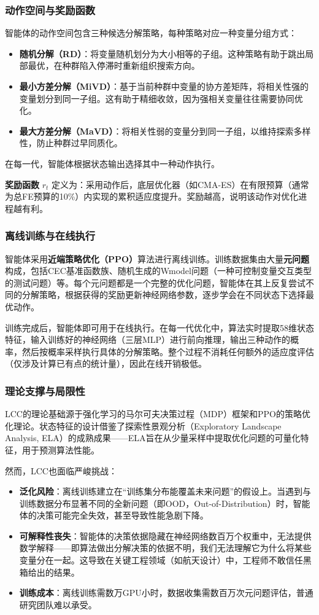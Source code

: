 \subsubsection{动作空间与奖励函数}
智能体的动作空间包含三种候选分解策略，每种策略对应一种变量分组方式：
\begin{itemize}
    \item \textbf{随机分解（RD）}：将变量随机划分为大小相等的子组。这种策略有助于跳出局部最优，在种群陷入停滞时重新组织搜索方向。
    \item \textbf{最小方差分解（MiVD）}：基于当前种群中变量的协方差矩阵，将相关性强的变量划分到同一子组。这有助于精细收敛，因为强相关变量往往需要协同优化。
    \item \textbf{最大方差分解（MaVD）}：将相关性弱的变量分到同一子组，以维持探索多样性，防止种群过早同质化。
\end{itemize}
在每一代，智能体根据状态输出选择其中一种动作执行。

\textbf{奖励函数} $r_t$ 定义为：采用动作后，底层优化器（如CMA-ES）在有限预算（通常为总FE预算的10\%）内实现的累积适应度提升。奖励越高，说明该动作对优化进程越有利。

\subsubsection{离线训练与在线执行}
智能体采用\textbf{近端策略优化（PPO）}算法进行离线训练。训练数据集由大量\textbf{元问题}构成，包括CEC基准函数族、随机生成的Wmodel问题（一种可控制变量交互类型的测试问题）等。每个元问题都是一个完整的优化问题，智能体在其上反复尝试不同的分解策略，根据获得的奖励更新神经网络参数，逐步学会在不同状态下选择最优动作。

训练完成后，智能体即可用于在线执行。在每一代优化中，算法实时提取58维状态特征，输入训练好的神经网络（三层MLP）进行前向推理，输出三种动作的概率，然后按概率采样执行具体的分解策略。整个过程不消耗任何额外的适应度评估（仅涉及计算已有点的统计量），因此在线开销极低。

\subsubsection{理论支撑与局限性}
LCC的理论基础源于强化学习的马尔可夫决策过程（MDP）框架和PPO的策略优化理论。状态特征的设计借鉴了探索性景观分析（Exploratory Landscape Analysis, ELA）的成熟成果——ELA旨在从少量采样中提取优化问题的可量化特征，用于预测算法性能。

然而，LCC也面临严峻挑战：
\begin{itemize}
    \item \textbf{泛化风险}：离线训练建立在“训练集分布能覆盖未来问题”的假设上。当遇到与训练数据分布显著不同的全新问题（即OOD，Out-of-Distribution）时，智能体的决策可能完全失效，甚至导致性能急剧下降。
    \item \textbf{可解释性丧失}：智能体的决策依据隐藏在神经网络数百万个权重中，无法提供数学解释——即算法做出分解决策的依据不明，我们无法理解它为什么将某些变量分在一起。这导致在关键工程领域（如航天设计）中，工程师不敢信任黑箱给出的结果。
    \item \textbf{训练成本}：离线训练需数万GPU小时，数据收集需数百万次元问题评估，普通研究团队难以承受。
\end{itemize}

